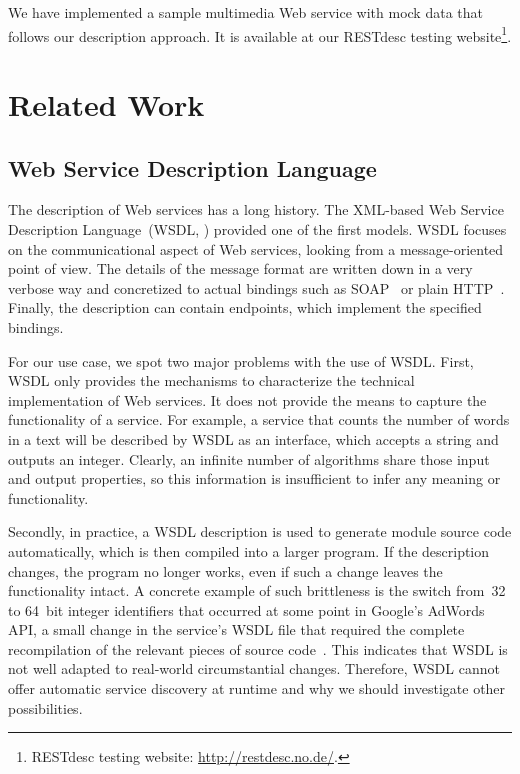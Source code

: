 \documentclass[smallextended]{svjour3}
\begin{document}
We have implemented a sample multimedia Web service with mock data that follows our description approach. It is available at our RESTdesc testing website\footnote{\label{RESTdescWebsite}RESTdesc testing website: \url{http://restdesc.no.de/}.}.

\section{Related Work} \label{sec:related-work}
\subsection{Web Service Description Language}
\label{subsec:WSDL}
The description of Web services has a long history. The XML-based Web Service Description Language~(WSDL, \cite{WSDL1,WSDL2}) provided one of the first models. WSDL focuses on the communicational aspect of Web services, looking from a message-oriented point of view. The details of the message format are written down in a very verbose way and concretized to actual bindings such as SOAP~\cite{SOAP} or plain HTTP~\cite{HTTP}. Finally, the description can contain endpoints, which implement the specified bindings.

For our use case, we spot two major problems with the use of WSDL. First, WSDL only provides the mechanisms to characterize the technical implementation of Web services. It does not provide the means to capture the functionality of a service. For example, a service that counts the number of words in a text will be described by WSDL as an interface, which accepts a string and outputs an integer. Clearly, an infinite number of algorithms share those input and output properties, so this information is insufficient to infer any meaning or functionality.

Secondly, in practice, a WSDL description is used to generate module source code automatically, which is then compiled into a larger program. If the description changes, the program no longer works, even if such a change leaves the functionality intact. A concrete example of such brittleness is the switch from~32 to 64~bit integer identifiers that occurred at some point in Google's AdWords API, a small change in the service's WSDL file that required the complete recompilation of the relevant pieces of source code~\cite{WhySOAPSucks}. This indicates that WSDL is not well adapted to real-world circumstantial changes.
Therefore, WSDL cannot offer automatic service discovery at runtime and why we should investigate other possibilities.
\end{document}
